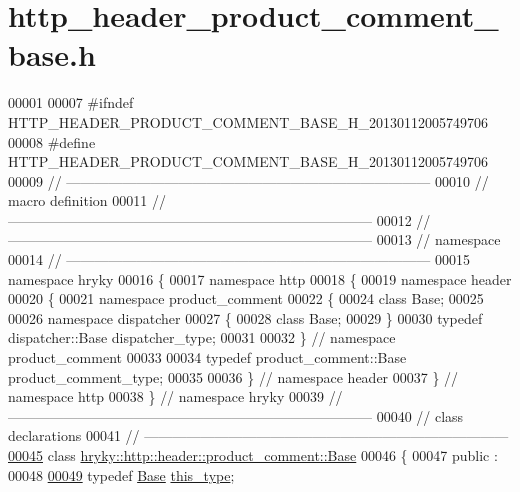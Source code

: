 \hypertarget{http__header__product__comment__base_8h_source}{\section{http\-\_\-header\-\_\-product\-\_\-comment\-\_\-base.\-h}
}

\begin{DoxyCode}
00001 
00007 \textcolor{preprocessor}{#ifndef HTTP\_HEADER\_PRODUCT\_COMMENT\_BASE\_H\_20130112005749706}
00008 \textcolor{preprocessor}{}\textcolor{preprocessor}{#define HTTP\_HEADER\_PRODUCT\_COMMENT\_BASE\_H\_20130112005749706}
00009 \textcolor{preprocessor}{}\textcolor{comment}{//
      ------------------------------------------------------------------------------}
00010 \textcolor{comment}{// macro definition}
00011 \textcolor{comment}{//
      ------------------------------------------------------------------------------}
00012 \textcolor{comment}{//
      ------------------------------------------------------------------------------}
00013 \textcolor{comment}{// namespace}
00014 \textcolor{comment}{//
      ------------------------------------------------------------------------------}
00015 \textcolor{keyword}{namespace }hryky
00016 \{
00017 \textcolor{keyword}{namespace }http
00018 \{
00019 \textcolor{keyword}{namespace }header
00020 \{
00021 \textcolor{keyword}{namespace }product\_comment
00022 \{
00024     \textcolor{keyword}{class }Base;
00025 
00026 \textcolor{keyword}{namespace }dispatcher
00027 \{
00028     \textcolor{keyword}{class }Base;
00029 \}
00030 \textcolor{keyword}{typedef} dispatcher::Base dispatcher\_type;
00031 
00032 \} \textcolor{comment}{// namespace product\_comment}
00033 
00034 \textcolor{keyword}{typedef} product\_comment::Base product\_comment\_type;
00035 
00036 \} \textcolor{comment}{// namespace header}
00037 \} \textcolor{comment}{// namespace http}
00038 \} \textcolor{comment}{// namespace hryky}
00039 \textcolor{comment}{//
      ------------------------------------------------------------------------------}
00040 \textcolor{comment}{// class declarations}
00041 \textcolor{comment}{//
      ------------------------------------------------------------------------------}
\hypertarget{http__header__product__comment__base_8h_source_l00045}{}\hyperlink{classhryky_1_1http_1_1header_1_1product__comment_1_1_base}{00045} \textcolor{comment}{}\textcolor{keyword}{class }\hyperlink{classhryky_1_1http_1_1header_1_1product__comment_1_1_base}{hryky::http::header::product_comment::Base}
00046 \{
00047 \textcolor{keyword}{public} :
00048 
\hypertarget{http__header__product__comment__base_8h_source_l00049}{}\hyperlink{classhryky_1_1http_1_1header_1_1product__comment_1_1_base_a2b2b9c50e25b1bbd7c1a77a69477409a}{00049}     \textcolor{keyword}{typedef} \hyperlink{classhryky_1_1http_1_1header_1_1product__comment_1_1_base}{Base} \hyperlink{classhryky_1_1http_1_1header_1_1product__comment_1_1_base_a2b2b9c50e25b1bbd7c1a77a69477409a}{this_type};

\end{DoxyCode}
